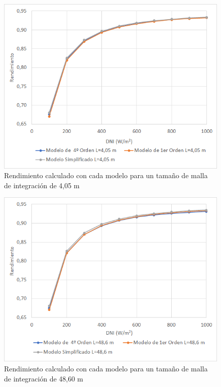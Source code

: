\begin{figure}[H]
\includegraphics[width=0.87\linewidth]{images/malla0405.png}
\caption{Rendimiento calculado con cada modelo para un tamaño de malla de integración de 4,05 m} 
\label{fig:malla0405}
\end{figure}

\begin{figure}[H]
\includegraphics[width=0.87\linewidth]{images/malla4860.png}
\caption{Rendimiento calculado con cada modelo para un tamaño de malla de integración de 48,60 m} 
\label{fig:malla4860}
\end{figure}

